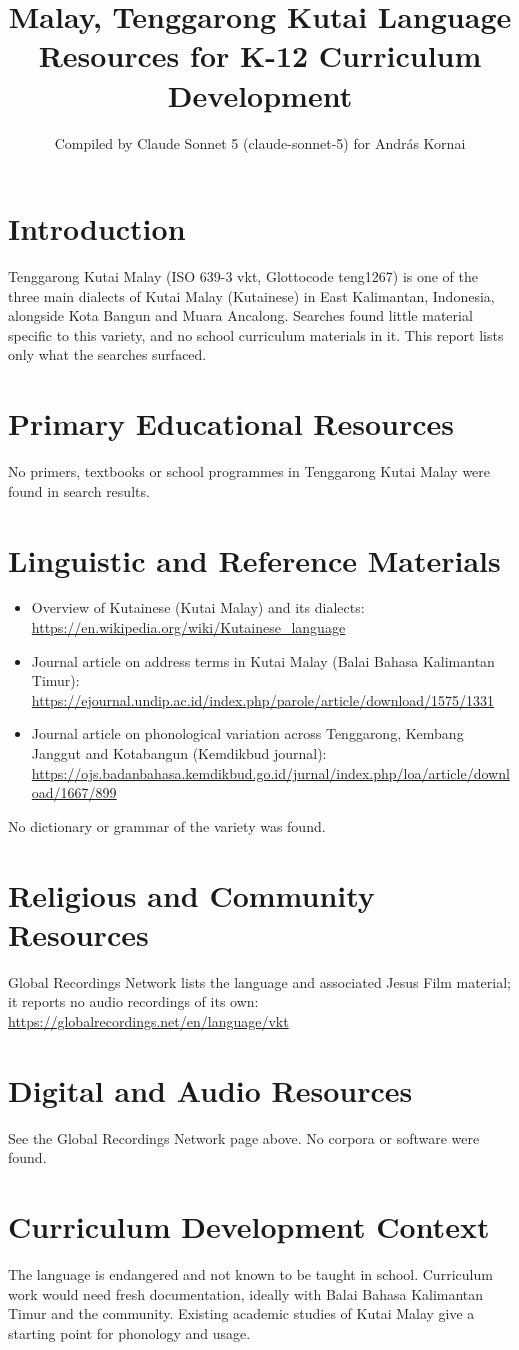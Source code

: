 \documentclass[12pt]{article}
\title{Malay, Tenggarong Kutai Language Resources for K-12 Curriculum Development}
\author{Compiled by Claude Sonnet 5 (claude-sonnet-5) for Andr\'as Kornai}
\date{}
\begin{document}
\maketitle

\section{Introduction}
Tenggarong Kutai Malay (ISO 639-3 vkt, Glottocode teng1267) is one of the three main dialects of Kutai Malay (Kutainese) in East Kalimantan, Indonesia, alongside Kota Bangun and Muara Ancalong. Searches found little material specific to this variety, and no school curriculum materials in it. This report lists only what the searches surfaced.

\section{Primary Educational Resources}
No primers, textbooks or school programmes in Tenggarong Kutai Malay were found in search results.

\section{Linguistic and Reference Materials}
\begin{itemize}
\item Overview of Kutainese (Kutai Malay) and its dialects: \url{https://en.wikipedia.org/wiki/Kutainese_language}
\item Journal article on address terms in Kutai Malay (Balai Bahasa Kalimantan Timur): \url{https://ejournal.undip.ac.id/index.php/parole/article/download/1575/1331}
\item Journal article on phonological variation across Tenggarong, Kembang Janggut and Kotabangun (Kemdikbud journal): \url{https://ojs.badanbahasa.kemdikbud.go.id/jurnal/index.php/loa/article/download/1667/899}
\end{itemize}
No dictionary or grammar of the variety was found.

\section{Religious and Community Resources}
Global Recordings Network lists the language and associated Jesus Film material; it reports no audio recordings of its own: \url{https://globalrecordings.net/en/language/vkt}

\section{Digital and Audio Resources}
See the Global Recordings Network page above. No corpora or software were found.

\section{Curriculum Development Context}
The language is endangered and not known to be taught in school. Curriculum work would need fresh documentation, ideally with Balai Bahasa Kalimantan Timur and the community. Existing academic studies of Kutai Malay give a starting point for phonology and usage.
\end{document}
